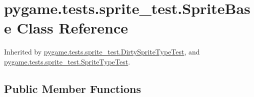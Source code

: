 \hypertarget{classpygame_1_1tests_1_1sprite__test_1_1_sprite_base}{}\section{pygame.\+tests.\+sprite\+\_\+test.\+Sprite\+Base Class Reference}
\label{classpygame_1_1tests_1_1sprite__test_1_1_sprite_base}


Inherited by \hyperlink{classpygame_1_1tests_1_1sprite__test_1_1_dirty_sprite_type_test}{pygame.\+tests.\+sprite\+\_\+test.\+Dirty\+Sprite\+Type\+Test}, and \hyperlink{classpygame_1_1tests_1_1sprite__test_1_1_sprite_type_test}{pygame.\+tests.\+sprite\+\_\+test.\+Sprite\+Type\+Test}.

\subsection*{Public Member Functions}
